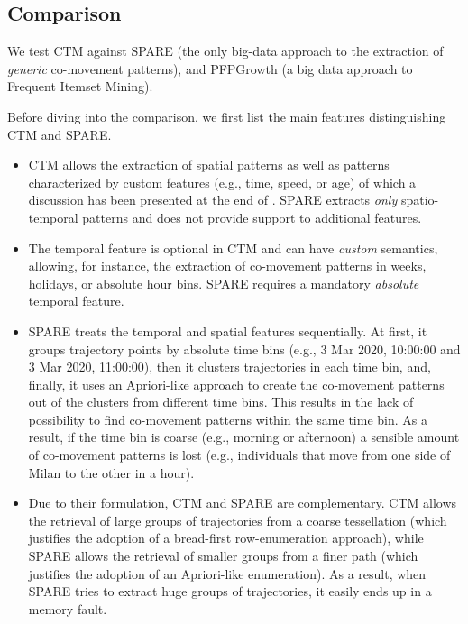 \documentclass[
]{ceurart}
\newcommand{\mf}[1]{#1}
\begin{document}
\subsection{Comparison}\label{ssec:comparison}
\mf{
We test CTM against SPARE \citep{DBLP:journals/pvldb/FanZWT16} (the only big-data approach to the extraction of \textit{generic} co-movement patterns), and PFPGrowth \citep{DBLP:conf/recsys/LiWZZC08} (a big data approach to Frequent Itemset Mining).

Before diving into the comparison, we first list the main features distinguishing CTM and SPARE.
}
\begin{itemize}
\item CTM allows the extraction of spatial patterns %
as well as patterns characterized by custom features (e.g., time, speed, or age) of which a discussion has been presented at the end of .
SPARE extracts \textit{only} spatio-temporal patterns and does not provide support to additional features.
\item The temporal feature is optional in CTM and can have \textit{custom} semantics, allowing, for instance, the extraction of co-movement patterns in weeks, holidays, or absolute hour bins. SPARE requires a mandatory \textit{absolute} temporal feature. 
\item SPARE treats the temporal and spatial features sequentially. At first, it groups trajectory points by absolute time bins (e.g., 3 Mar 2020, 10:00:00 and 3 Mar 2020, 11:00:00), then it clusters trajectories in each time bin, and, finally, it uses an Apriori-like approach to create the co-movement patterns out of the clusters from different time bins.
This results in the lack of possibility to find co-movement patterns within the same time bin.
As a result, if the time bin is coarse (e.g., morning or afternoon) a sensible amount of co-movement patterns is lost (e.g., individuals that move from one side of Milan to the other in a hour).
\item Due to their formulation, CTM and SPARE are complementary.
CTM allows the retrieval of large groups of trajectories from a coarse tessellation (which justifies the adoption of a bread-first row-enumeration approach), while SPARE allows the retrieval of smaller groups from a finer path (which justifies the adoption of an Apriori-like enumeration).
As a result, when SPARE tries to extract huge groups of trajectories, it easily ends up in a memory fault.
\end{itemize}
\end{document}
